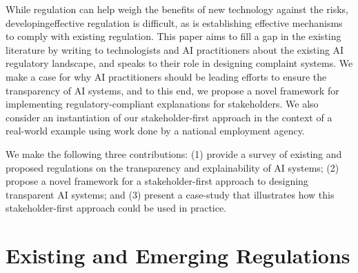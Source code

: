 \documentclass[sigconf, nonacm]{acmart}
\begin{document}
While regulation can help weigh the benefits of new technology against the risks, developingeffective regulation is difficult, as is establishing effective mechanisms to comply with existing regulation. This paper aims to fill a gap in the existing literature by writing to technologists and AI practitioners about the existing AI regulatory landscape, and speaks to their role in designing complaint systems. We make a case for why AI practitioners should be leading efforts to ensure the transparency of AI systems, and to this end, we propose a novel framework for implementing regulatory-compliant explanations for stakeholders. We also consider an instantiation of our stakeholder-first approach in the context of a real-world example using work done by a national employment agency.

We make the following three contributions: (1) provide a survey of existing and proposed regulations on the transparency and explainability of AI systems; (2) propose a novel framework for a stakeholder-first approach to designing transparent AI systems; and (3) present a case-study that illustrates how this stakeholder-first approach could be used in practice.




\section{Existing and Emerging Regulations}
\label{sec:laws}
\end{document}
